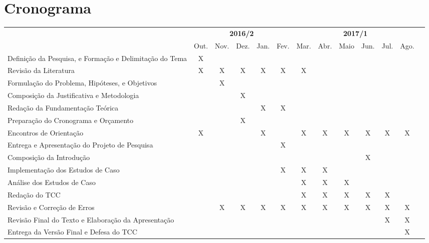 \section{Cronograma}
\label{sec:cronograma}

\begin{adjustbox}{center}
  \tiny
  \begin{tabular}{|p{4cm}|c|c|c|c|c|c|c|c|c|c|c|l|}
    \cline{1-12}
      \multicolumn{1}{|c|}{
        \multirow{2}{*}{
          \diagbox[width=4.4cm]{
            \textbf{Atividades}
          }{
            \textbf{Ano/Mês}
          }}}
      & \multicolumn{5}{c|}{\textbf{2016/2}}
      & \multicolumn{6}{c|}{\textbf{2017/1}} \\
      \cline{2-12}
      & Out. & Nov. & Dez. & Jan. & Fev. & Mar. & Abr. & Maio & Jun. & Jul. & Ago. \\
    \hline
      Definição da Pesquisa, e Formação e Delimitação do Tema
      & X &  &  &  &  &  &  &  &  &  &  \\
    \hline
      Revisão da Literatura
      & X & X & X & X & X & X & & &  &  &  \\
    \hline
      Formulação do Problema, Hipóteses, e Objetivos
      & & X & & &  &  &  &  &  &  &  \\
    \hline
      Composição da Justificativa e Metodologia
      & & & X & & & & & & & & \\
    \hline
      Redação da Fundamentação Teórica
      & & & & X & X & & & & & & \\
    \hline
      Preparação do Cronograma e Orçamento
      & & & X & & & & & & & & \\
    \hline
      Encontros de Orientação
      & X & & & X & & X & X & X & X & X & X \\
    \hline
      Entrega e Apresentação do Projeto de Pesquisa
      & & & & & X & & & & & & \\
    \hline
      Composição da Introdução
      & & & & & & & & & X & & \\
    \hline
      Implementação dos Estudos de Caso
      & & & & & X & X & X & & & & \\
    \hline
      Análise dos Estudos de Caso
      & & & & & & X & X & X & & & \\
    \hline
      Redação do TCC
      & & & & & & X & X & X & X & X & \\
    \hline
      Revisão e Correção de Erros
      & & X & X & X & X & X & X & X & X & X & X \\
    \hline
      Revisão Final do Texto e Elaboração da Apresentação
      & & & & & & & & & & X & X \\
    \hline
      Entrega da Versão Final e Defesa do TCC
      & & & & & & & & & & & X \\
    \hline
  \end{tabular}
\end{adjustbox}

